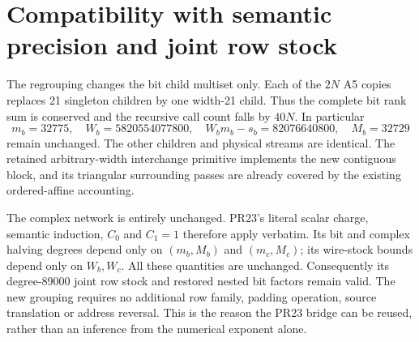 \documentclass[11pt]{article}
\begin{document}
\section{Compatibility with semantic precision and joint row stock}
The regrouping changes the bit child multiset only. Each of the $2N$
A5 copies replaces 21 singleton children by one width-21 child. Thus the
complete bit rank sum is conserved and the recursive call count falls by
$40N$. In particular
\[
 m_b=32775,\quad W_b=5820554077800,\quad
 W_bm_b-s_b=82076640800,\quad M_b=32729
\]
remain unchanged. The other children and physical streams are identical.
The retained arbitrary-width interchange primitive implements the new
contiguous block, and its triangular surrounding passes are already
covered by the existing ordered-affine accounting.

The complex network is entirely unchanged. PR23's literal scalar charge,
semantic induction, $C_0$ and $C_1=1$ therefore apply verbatim. Its bit and
complex halving degrees depend only on $(m_b,M_b)$ and $(m_c,M_c)$; its
wire-stock bounds depend only on $W_b,W_c$. All these quantities are
unchanged. Consequently its degree-89000 joint row stock and restored
nested bit factors remain valid. The new grouping requires no additional
row family, padding operation, source translation or address reversal.
This is the reason the PR23 bridge can be reused, rather than an inference
from the numerical exponent alone.
\end{document}
